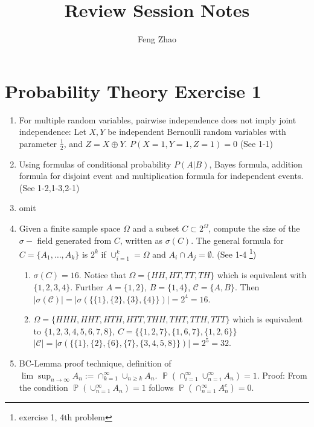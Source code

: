 \documentclass{article}
\author{Feng Zhao}
\title{Review Session Notes}
\DeclareMathOperator{\bP}{\mathbb{P}}
\begin{document}
\maketitle

\section{Probability Theory Exercise 1}
\begin{enumerate}
    \item For multiple random variables, pairwise independence does not imply joint independence: Let $X, Y$ be independent Bernoulli random variables
    with parameter $\frac{1}{2}$, and $Z=X\oplus Y$. $P(X=1,Y=1,Z=1)=0$ (See 1-1)
    \item Using formulas of conditional probability $P(A|B)$, Bayes formula, addition formula for
    disjoint event and multiplication formula for independent events. (See 1-2,1-3,2-1)
    \item omit
    \item Given a finite sample space $\Omega$ and a subset $C\subset 2^{\Omega}$, compute the size of the $\sigma-$
    field generated from $C$, written as $\sigma(C)$.
    The general formula for $C=\{A_1, \dots, A_k\}$ is $2^k$ if $\cup_{i=1}^k = \Omega$ and
    $A_i \cap A_j = \emptyset$. (See 1-4 \footnote{exercise 1, 4th problem})
    \begin{enumerate}
    \item $\sigma(C)=16$. Notice that 
    $\Omega=\{HH,HT,TT,TH\}$ which is equivalent with
    $\{1,2,3,4\}$. Further
    $A=\{1,2\}$, $B=\{1,4\}$, $\mathcal{C}=\{A,B\}$.
    Then $|\sigma(\mathcal{C})| = |\sigma(\{ \{1\},\{2\},\{3\},\{4\}\})|
    =2^4=16$.
    \item $\Omega=\{HHH,HHT, HTH, HTT,THH,THT, TTH, TTT\}$
    which is equivalent to $\{1,2,3,4,5,6,7,8\}$,
    $C=\{\{1,2,7\},\{1,6,7\}, \{1,2,6\}\}$
    $|\mathcal{C}| = |\sigma(\{\{1\},\{2\},\{6\},\{7\},\{3,4,5,8\} \})| =2^5= 32$.
    \end{enumerate}
    \item BC-Lemma proof technique, definition of $\lim\sup_{n\to \infty} A_n:=\cap_{k=1}^{\infty}\cup_{n\geq k}A_n$.
    $\bP(\cap_{i=1}^{\infty} \cup_{n=i}^{\infty} A_n ) 
=1$. Proof: From the condition
$\bP(\cup_{n=1}^{\infty} A_n) = 1$ follows 
$\bP(\cap_{n=1}^{\infty} A^c_n) = 0$.

\end{enumerate}
\end{document}

